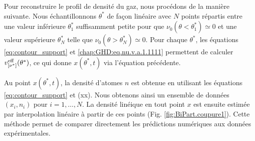 \medskip

Pour reconstruire le profil de densité du gaz, nous procédons de la manière suivante. Nous échantillonnons \(\theta^*\) de façon linéaire avec \(N\) points répartis entre une valeur inférieure \(\theta_1^*\) suffisamment petite pour que \(\nu_0(\theta<\theta_1^*)\simeq 0\) et une valeur supérieure \(\theta_N^*\) telle que \(\nu_0(\theta>\theta_N^*)\simeq 0\). Pour chaque \(\theta^*\), les équations \eqref{eq:contour_support} et \eqref{chap:GHD:eq.nu.v.a.1.1111} permettent de calculer \(v^{\rm eff}_{[\nu^*]}(\theta^*)\), ce qui donne \(x(\theta^*,t)\) via l’équation précédente. 

\medskip

Au point \(x(\theta^*,t)\), la densité d’atomes \(n\) est obtenue en utilisant les équations \eqref{eq:contour_support} et {\color{blue}(xx)}. Nous obtenons ainsi un ensemble de données \((x_i,n_i)\) pour \(i=1,\dots,N\). La densité linéique en tout point \(x\) est ensuite estimée par interpolation linéaire à partir de ces points (Fig. \ref{fig:BiPart.coupure1}). Cette méthode permet de comparer directement les prédictions numériques aux données expérimentales.

